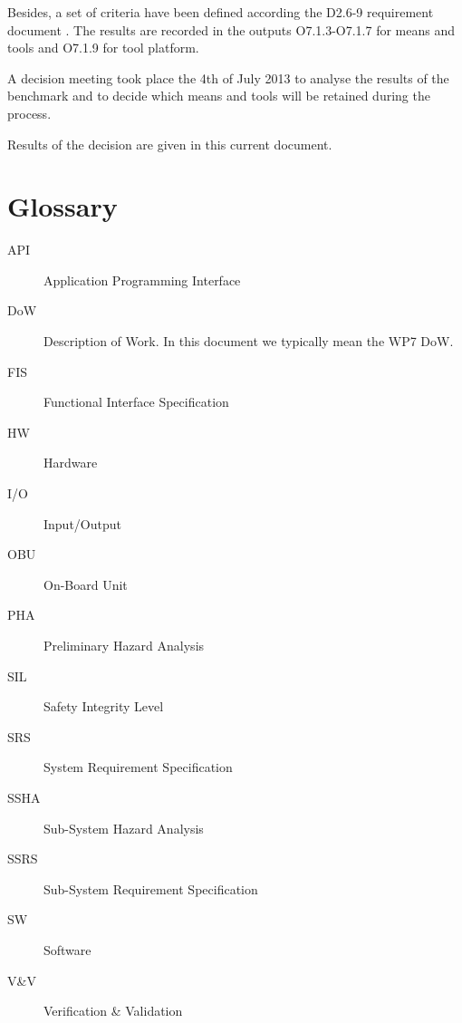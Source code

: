 Besides,  a set of criteria have been defined according the D2.6-9 requirement document \citep{D2_6}.  The results are recorded in the outputs O7.1.3-O7.1.7 \citep{WP7_O713_O717} for means and tools and O7.1.9 \citep{WP7_O719} for tool platform.

A decision meeting took place the 4th of July 2013 to analyse the results of the benchmark and to decide which means and tools will be retained during the process.

Results of the decision are given in this current document. 




\section{Glossary}
\label{sec:glossary}

\begin{description}
\item[API] Application Programming Interface
\item[DoW] Description of Work.  In this document we typically mean the WP7 DoW.
\item[FIS] Functional Interface Specification
\item[HW] Hardware
\item[I/O] Input/Output
\item[OBU] On-Board Unit
\item[PHA] Preliminary Hazard Analysis
\item[SIL] Safety Integrity Level
\item[SRS] System Requirement Specification
\item[SSHA] Sub-System Hazard Analysis
\item[SSRS] Sub-System Requirement Specification
\item[SW] Software
\item[V\&V] Verification \& Validation
\end{description}




